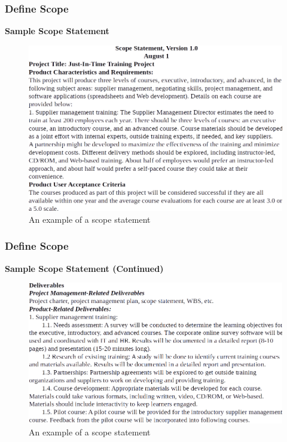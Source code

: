 \documentclass[aspectratio=169]{beamer}
\begin{document}

\begin{frame}
\frametitle{Define Scope}
\textbf{Sample Scope Statement}
\begin{figure}
\includegraphics[scale=0.35]{scope_stat_1}
\vspace{-0.3cm}
\caption{An example of a scope statement}
\end{figure}
\end{frame}


\begin{frame}
\frametitle{Define Scope}
\textbf{Sample Scope Statement (Continued)}
\begin{figure}
\includegraphics[scale=0.35]{scope_stat_2}

\caption{An example of a scope statement}
\end{figure}
\end{frame}
\end{document}
